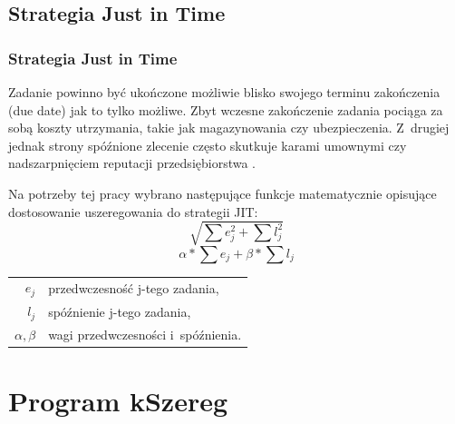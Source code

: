\documentclass{prezentacja}
\begin{document}
\subsection{Strategia Just in Time}
\begin{frame}
    \frametitle{Strategia Just in Time}
    Zadanie powinno być ukończone możliwie blisko swojego terminu zakończenia (due date) jak to tylko możliwe. Zbyt wczesne zakończenie zadania pociąga za sobą koszty utrzymania, takie jak magazynowania czy ubezpieczenia. Z~drugiej jednak strony spóźnione zlecenie często skutkuje karami umownymi czy nadszarpnięciem reputacji przedsiębiorstwa \cite{genetyczne}.

    Na potrzeby tej pracy wybrano następujące funkcje matematycznie opisujące dostosowanie uszeregowania do strategii JIT:
\small{
    \begin{equation}
        \sqrt{\sum e_j^2 + \sum l_j^2}
        \label{eq:w1}
    \end{equation}
    \begin{equation}
        \alpha*\sum e_j + \beta*\sum l_j
        \label{eq:w2}
    \end{equation}
}
\footnotesize{
    \begin{tabular}{r l}    
    \(e_j\) & przedwczesność j-tego zadania, \\
    \(l_j\) & spóźnienie j-tego zadania, \\
    \(\alpha, \beta\) & wagi przedwczesności i~spóźnienia.
    \end{tabular}
}
\end{frame}
\section{Program kSzereg}
\end{document}
